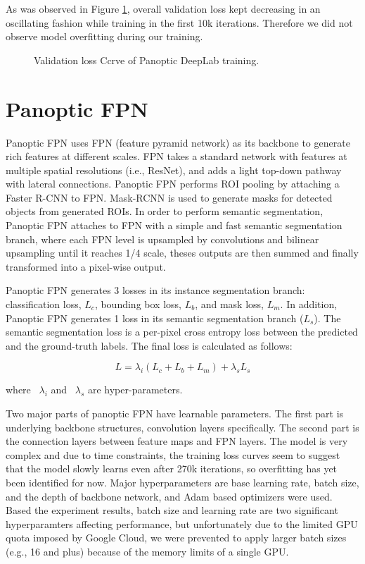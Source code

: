 \documentclass[10pt,twocolumn,letterpaper]{article}
\begin{document}
As was observed in Figure \ref{fig:panoptic_deeplab_lc}, overall validation loss kept decreasing in an oscillating fashion while training in the first 10k iterations. Therefore we did not observe model overfitting during our training.

\begin{figure}[htbp]
\centering
{}
\caption{Validation loss Ccrve of Panoptic DeepLab training.}
\label{fig:panoptic_deeplab_lc}
\end{figure}

\section{Panoptic FPN}
\label{sec:panoptic_fpn}

Panoptic FPN uses FPN (feature pyramid network) as its backbone to generate rich features at different scales. FPN takes a standard network with features at multiple spatial resolutions (i.e., ResNet), and adds a light top-down pathway with lateral connections. Panoptic FPN performs ROI pooling by attaching a Faster R-CNN to FPN. Mask-RCNN is used to generate masks for detected objects from generated ROIs. In order to perform semantic segmentation, Panoptic FPN attaches to FPN with a simple and fast semantic segmentation branch, where each FPN level is upsampled by convolutions and bilinear upsampling until it reaches 1/4 scale, theses outputs are then summed and finally transformed into a pixel-wise output.

Panoptic FPN generates 3 losses in its instance segmentation branch: classification loss, $L_{c}$, bounding box loss, $L_{b}$, and mask loss, $L_{m}$. In addition, Panoptic FPN generates 1 loss in its semantic segmentation branch ($L_{s}$). The semantic segmentation loss is a per-pixel cross entropy loss between the predicted and the ground-truth labels. The final loss is calculated as follows:

\[
L = \lambda_{i} (L_{c} + L_{b} + L_{m}) + \lambda_{s}L_{s}
\]

where ~$\lambda_{i}$ and ~$\lambda_{s}$ are hyper-parameters.

Two major parts of panoptic FPN have learnable parameters. The first part is underlying backbone structures, convolution layers specifically. The second part is the connection layers between feature maps and FPN layers. The model is very complex and due to time constraints, the training loss curves seem to suggest that the model slowly learns even after 270k iterations, so overfitting has yet been identified for now. Major hyperparameters are base learning rate, batch size, and the depth of backbone network, and Adam based optimizers were used. Based the experiment results, batch size and learning rate are two significant hyperparamters affecting performance, but unfortunately due to the limited GPU quota imposed by Google Cloud, we were prevented to apply larger batch sizes (e.g., 16 and plus) because of the memory limits of a single GPU. 
\end{document}
